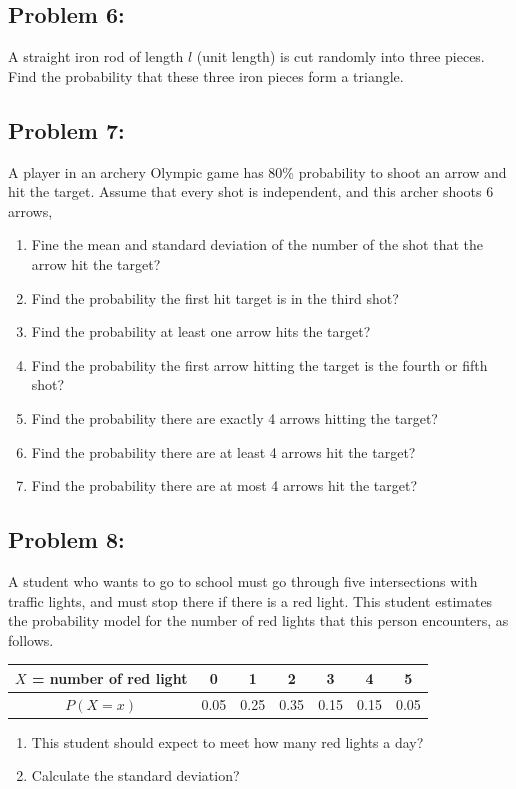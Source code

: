 \documentclass[12pt,en,a4paper]{article}
\begin{document}
	\subsection*{Problem 6:}
	A straight iron rod of length $l$ (unit length) is cut randomly into three pieces. Find the probability that these three iron pieces form a triangle.
	
	\subsection*{Problem 7:}
	A player in an archery Olympic game has 80\% probability to shoot an arrow and hit the target. Assume that every shot is independent, and this archer shoots 6 arrows,
	\begin{enumerate}
		\item Fine the mean and standard deviation of the number of the shot that the arrow hit the target?
		\item Find the probability the first hit target is in the third shot?
		\item Find the probability at least one arrow hits the target?
		\item Find the probability the first arrow hitting the target is the fourth or fifth shot?
		\item Find the probability there are exactly 4 arrows hitting the target?
		\item Find the probability there are at least 4 arrows hit the target?
		\item Find the probability there are at most 4 arrows hit the target?
	\end{enumerate}
	
	\subsection*{Problem 8:}
	A student who wants to go to school must go through five intersections with traffic lights, and must stop there if there is a red light. This student estimates the probability model for the number of red lights that this person encounters, as follows. \\
	\begin{tabular}{|c|c|c|c|c|c|c|}
		\hline
		$X$ = number of red light & 0 & 1 & 2 & 3 & 4 & 5 \\
		\hline
		$P(X = x)$ & 0.05 & 0.25 & 0.35 & 0.15 & 0.15 & 0.05 \\
		\hline
	\end{tabular}
	\begin{enumerate}
		\item This student should expect to meet how many red lights a day?
		\item Calculate the standard deviation?
	\end{enumerate}
	
\end{document}
